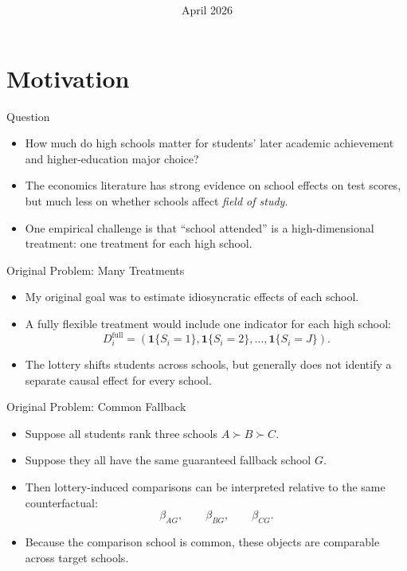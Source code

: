 \documentclass[notes,11pt,aspectratio=169]{beamer}
\title{\texorpdfstring{\centering{How Much Do High Schools Matter?\\[0.35em]
Causal Effects on Achievement and Major Choice} \\ }{How Much Do High Schools Matter? Causal Effects on Achievement and Major Choice}}
\author[BEAM]{%
  \texorpdfstring{%
    \begin{columns}
      \column{.3\linewidth}
      \centering
      \column{.3\linewidth}
      \centering
      Bruno E. Aravena-Magüida\\ UChicago
      \column{.3\linewidth}
      \centering
    \end{columns}
  }
  {BEAM}
}
\date{\vspace{20pt}\hfill April 2026}
\let\oldparencite\parencite
\renewcommand{\parencite}[2][]{%
  \footnotesize {\tiny \oldparencite[#1]{#2}} \normalsize %
}
\newenvironment{wideitemize}{%
  \begin{minipage}{0.90\textwidth}
  \begin{itemize}
  \addtolength{\itemsep}{1em}
}{%
  \end{itemize}
  \end{minipage}
}
\newenvironment{cwideitemize}{%
  \begin{center}
  \begin{minipage}{0.90\textwidth}
  \begin{itemize}
  \addtolength{\itemsep}{1em}
}{%
  \end{itemize}
  \end{minipage}
  \end{center}
}
\begin{document}
\maketitle

\section{Motivation}

\begin{frame}{Question}
\begin{cwideitemize}
  \item How much do high schools matter for students' later academic achievement and higher-education major choice?

  \item The economics literature has strong evidence on school effects on test scores, but much less on whether schools affect \textit{field of study}. \parencite{angrist_stand_2016,dobbie_medium-term_2015,angrist_leveraging_2017,angrist_credible_2024}

  \item One empirical challenge is that ``school attended'' is a high-dimensional treatment: one treatment for each high school.
\end{cwideitemize}
\end{frame}

\begin{frame}{Original Problem: Many Treatments}
\begin{wideitemize}
  \item My original goal was to estimate idiosyncratic effects of each school.

  \item A fully flexible treatment would include one indicator for each high school:
  \[
    D_i^{\mathrm{full}}
    =
    \left(
    \mathbf{1}\{S_i=1\},
    \mathbf{1}\{S_i=2\},
    \ldots,
    \mathbf{1}\{S_i=J\}
    \right).
  \]

  \item The lottery shifts students across schools, but generally does not identify a separate causal effect for every school.
\end{wideitemize}
\end{frame}

\begin{frame}{Original Problem: Common Fallback}
\begin{wideitemize}
  \item Suppose all students rank three schools \(A \succ B \succ C\).

  \item Suppose they all have the same guaranteed fallback school \(G\).

  \item Then lottery-induced comparisons can be interpreted relative to the same counterfactual:
  \[
    \beta_{AG}, \qquad \beta_{BG}, \qquad \beta_{CG}.
  \]

  \item Because the comparison school is common, these objects are comparable across target schools.
\end{wideitemize}
\end{frame}
\end{document}
